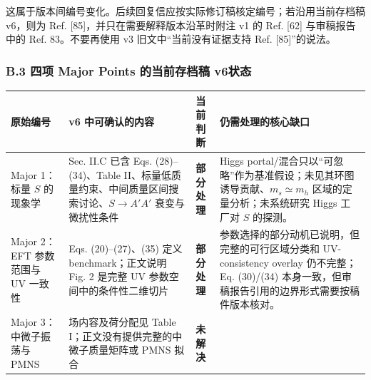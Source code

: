\documentclass[
  chinese,
  UTF8]{ctexart}
\newcounter{none} %
\begin{document}
这属于版本间编号变化。后续回复信应按实际修订稿核定编号；若沿用当前存档稿
v6，则为 Ref. {[}85{]}，并只在需要解释版本沿革时附注 v1 的 Ref. {[}62{]}
与审稿报告中的 Ref. 83。不要再使用 v3 旧文中``当前没有证据支持 Ref.
{[}85{]}''的说法。

\subsubsection{B.3 四项 Major Points 的当前存档稿
v6状态}\label{b.3-ux56dbux9879-major-points-ux7684ux5f53ux524dux5b58ux6863ux7a3f-v6ux72b6ux6001}

{\def\LTcaptype{none} %
\begin{longtable}[]{@{}
  >{\raggedright\arraybackslash}p{}
  >{\raggedright\arraybackslash}p{}
  >{\raggedright\arraybackslash}p{}
  >{\raggedright\arraybackslash}p{}@{}}
\toprule\noalign{}
\begin{minipage}[b]{\linewidth}\raggedright
原始编号
\end{minipage} & \begin{minipage}[b]{\linewidth}\raggedright
v6 中可确认的内容
\end{minipage} & \begin{minipage}[b]{\linewidth}\raggedright
当前判断
\end{minipage} & \begin{minipage}[b]{\linewidth}\raggedright
仍需处理的核心缺口
\end{minipage} \\
\midrule\noalign{}
\endhead
\bottomrule\noalign{}
\endlastfoot
Major 1：标量 \(S\) 的现象学 & Sec. II.C 已含 Eqs. (28)--(34)、Table
II、标量低质量约束、中间质量区间搜索讨论、\(S\to A'A'\) 衰变与微扰性条件
& \textbf{部分处理} & Higgs
portal/混合只以``可忽略''作为基准假设；未见其环图诱导贡献、\(m_s\simeq m_h\)
区域的定量分析；未系统研究 Higgs 工厂对 \(S\) 的探测。 \\
Major 2：EFT 参数范围与 UV 一致性 & Eqs. (20)--(27)、(35) 定义
benchmark；正文说明 Fig. 2 是完整 UV 参数空间中的条件性二维切片 &
\textbf{部分处理} & 参数选择的部分动机已说明，但完整的可行区域分类和
UV-consistency overlay 仍不完整；Eq. (30)/(34)
本身一致，但审稿报告引用的边界形式需要按稿件版本核对。 \\
Major 3：中微子振荡与 PMNS & 场内容及荷分配见 Table
I；正文没有提供完整的中微子质量矩阵或 PMNS 拟合 & \textbf{未解决} &

\end{longtable}}
\end{document}
